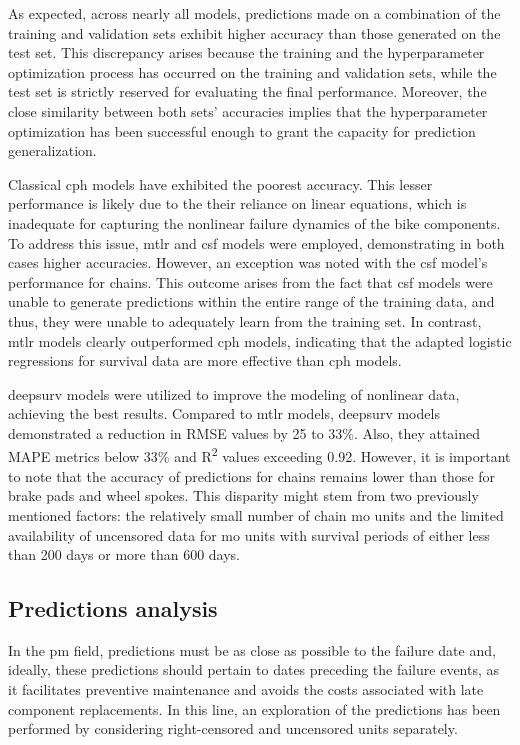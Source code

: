     As expected, across nearly all models, predictions made on a combination of the training and validation sets exhibit higher accuracy than those generated on the test set. This discrepancy arises because the training and the hyperparameter optimization process has occurred on the training and validation sets, while the test set is strictly reserved for evaluating the final performance. Moreover, the close similarity between both sets' accuracies implies that the hyperparameter optimization has been successful enough to grant the capacity for prediction generalization.

    Classical \ac{cph} models have exhibited the poorest accuracy. This lesser performance is likely due to the their reliance on linear equations, which is inadequate for capturing the nonlinear failure dynamics of the bike components. To address this issue, \ac{mtlr} and \ac{csf} models were employed, demonstrating in both cases higher accuracies. However, an exception was noted with the \ac{csf} model's performance for chains. This outcome arises from the fact that \ac{csf} models were unable to generate predictions within the entire range of the training data, and thus, they were unable to adequately learn from the training set. In contrast, \ac{mtlr} models clearly outperformed \ac{cph} models, indicating that the adapted logistic regressions for survival data are more effective than \ac{cph} models.

    \ac{deepsurv} models were utilized to improve the modeling of nonlinear data, achieving the best results. Compared to \ac{mtlr} models, \ac{deepsurv} models demonstrated a reduction in RMSE values by 25 to 33\%. Also, they attained MAPE metrics below 33\% and R\textsuperscript{2} values exceeding 0.92. However, it is important to note that the accuracy of predictions for chains remains lower than those for brake pads and wheel spokes. This disparity might stem from two previously mentioned factors: the relatively small number of chain \ac{mo} units and the limited availability of uncensored data for \ac{mo} units with survival periods of either less than 200 days or more than 600 days.

\subsection{Predictions analysis}

    In the \ac{pm} field, predictions must be as close as possible to the failure date and, ideally, these predictions should pertain to dates preceding the failure events, as it facilitates preventive maintenance and avoids the costs associated with late component replacements. In this line, an exploration of the predictions has been performed by considering right-censored and uncensored units separately.

